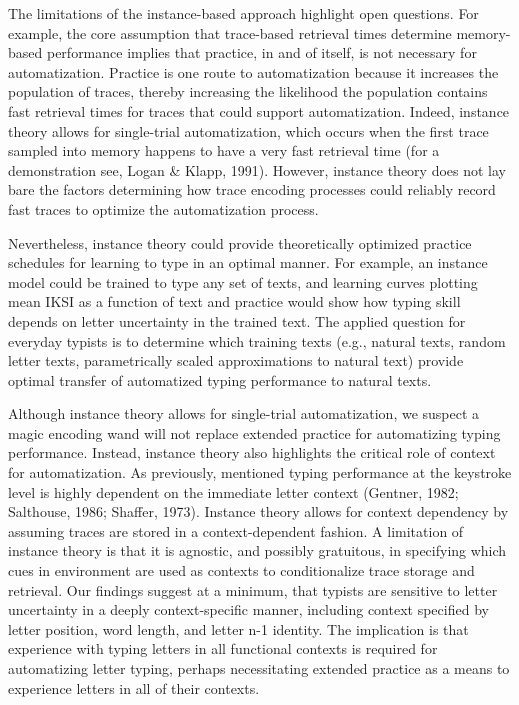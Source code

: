 \documentclass[floatsintext,man]{apa6}
\theoremstyle{definition}
\theoremstyle{definition}
\theoremstyle{definition}
\theoremstyle{remark}
\begin{document}
The limitations of the instance-based approach highlight open questions.
For example, the core assumption that trace-based retrieval times
determine memory-based performance implies that practice, in and of
itself, is not necessary for automatization. Practice is one route to
automatization because it increases the population of traces, thereby
increasing the likelihood the population contains fast retrieval times
for traces that could support automatization. Indeed, instance theory
allows for single-trial automatization, which occurs when the first
trace sampled into memory happens to have a very fast retrieval time
(for a demonstration see, Logan \& Klapp, 1991). However, instance
theory does not lay bare the factors determining how trace encoding
processes could reliably record fast traces to optimize the
automatization process.

Nevertheless, instance theory could provide theoretically optimized
practice schedules for learning to type in an optimal manner. For
example, an instance model could be trained to type any set of texts,
and learning curves plotting mean IKSI as a function of text and
practice would show how typing skill depends on letter uncertainty in
the trained text. The applied question for everyday typists is to
determine which training texts (e.g., natural texts, random letter
texts, parametrically scaled approximations to natural text) provide
optimal transfer of automatized typing performance to natural texts.

Although instance theory allows for single-trial automatization, we
suspect a magic encoding wand will not replace extended practice for
automatizing typing performance. Instead, instance theory also
highlights the critical role of context for automatization. As
previously, mentioned typing performance at the keystroke level is
highly dependent on the immediate letter context (Gentner, 1982;
Salthouse, 1986; Shaffer, 1973). Instance theory allows for context
dependency by assuming traces are stored in a context-dependent fashion.
A limitation of instance theory is that it is agnostic, and possibly
gratuitous, in specifying which cues in environment are used as contexts
to conditionalize trace storage and retrieval. Our findings suggest at a
minimum, that typists are sensitive to letter uncertainty in a deeply
context-specific manner, including context specified by letter position,
word length, and letter n-1 identity. The implication is that experience
with typing letters in all functional contexts is required for
automatizing letter typing, perhaps necessitating extended practice as a
means to experience letters in all of their contexts.
\end{document}
